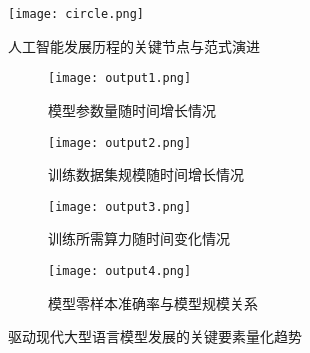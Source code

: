 \begin{figure}[H]
    \centering
    \texttt{[image: circle.png]} 
    \caption{人工智能发展历程的关键节点与范式演进}
    \label{fig:ai_history}
\end{figure}

\begin{figure}[H]
    \centering
    \begin{subfigure}[b]{0.48\textwidth}
        \centering
        \texttt{[image: output1.png]}
        \caption{模型参数量随时间增长情况}
        \label{fig:model_params_growth}
    \end{subfigure}
    \hfill 
    \begin{subfigure}[b]{0.48\textwidth}
        \centering
        \texttt{[image: output2.png]}
        \caption{训练数据集规模随时间增长情况}
        \label{fig:dataset_size_growth}
    \end{subfigure}
    
    \vspace{1cm} 
    
    \begin{subfigure}[b]{0.48\textwidth}
        \centering
        \texttt{[image: output3.png]}
        \caption{训练所需算力随时间变化情况}
        \label{fig:compute_reqs_growth}
    \end{subfigure}
    \hfill 
    \begin{subfigure}[b]{0.48\textwidth}
        \centering
        \texttt{[image: output4.png]}
        \caption{模型零样本准确率与模型规模关系}
        \label{fig:accuracy_vs_size}
    \end{subfigure}

    \caption{驱动现代大型语言模型发展的关键要素量化趋势}
    \label{fig:llm_trends_overview}
\end{figure}